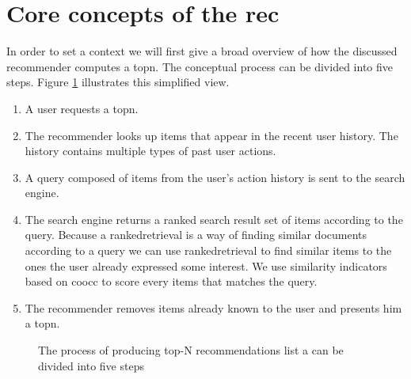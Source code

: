 \section{Core concepts of the \gls{rec}}
\label{sec:design}

In order to set a context we will first give a broad overview of how the discussed recommender computes a \gls{topn}.
The conceptual process can be divided into five steps. Figure \ref{fig:topndataflow} illustrates this simplified view.

\begin{enumerate}
\item A user requests a \gls{topn}.
\item The recommender looks up items that appear in the recent user history. The history contains multiple types of past user actions.
\item A query composed of items from the user's action history is sent to the search engine.
\item The search engine returns a ranked search result set of items according to the query. Because a \gls{rankedretrieval} is a way of finding similar documents according to a query we can use \gls{rankedretrieval} to find similar items to the ones the user already expressed some interest.
 We use similarity indicators based on \gls{coocc} to score every items that matches the query.
\item The recommender removes items already known to the user and presents him a \gls{topn}.
\end{enumerate}


\begin{figure}
  \centering
  \caption{The process of producing top-N recommendations list a can be divided into five steps}
  \label{fig:topndataflow}
\end{figure}

